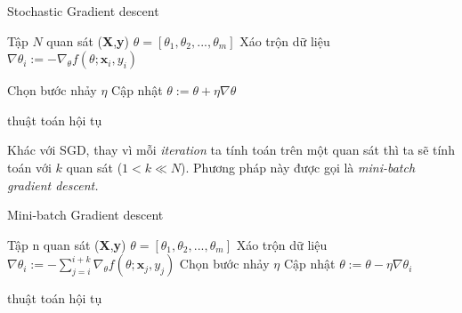 \begin{algorithm}[H]
\label{alg:sgd}
\caption{Stochastic Gradient descent}
\begin{algorithmic}[1]
\REQUIRE Tập $N$ quan sát (\textbf{X},\textbf{y})
\REQUIRE  $\theta=[\theta_1,\theta_2,...,\theta_m]$
\REPEAT 
\STATE Xáo trộn dữ liệu
\STATE $\nabla \theta_i := - \nabla_{\theta}f(\theta;\textbf{x}_i,y_i)$

\STATE Chọn bước nhảy $\eta$
\STATE Cập nhật $\theta := \theta + \eta\nabla\theta$
	\STATE {}
\ENDIF
\ENDFOR

\UNTIL	thuật toán hội tụ
\end{algorithmic}
\end{algorithm}
Khác với SGD, thay vì mỗi \textit{iteration} ta tính toán trên một quan sát thì ta sẽ tính toán với $k$ quan sát ($1<k\ll N$). Phương pháp này được gọi là \textit{mini-batch gradient descent.}

\begin{algorithm}[H]
\label{alg:minibatch}
\caption{Mini-batch Gradient descent}
\begin{algorithmic}[1]
\REQUIRE Tập n quan sát (\textbf{X},\textbf{y})
\REQUIRE $\theta=[\theta_1,\theta_2,...,\theta_m]$
\REPEAT 
\STATE Xáo trộn dữ liệu
\STATE $\nabla \theta_i := -\sum^{i+k}_{j=i} \nabla_{\theta}f(\theta;\textbf{x}_j,y_j)$
\STATE Chọn bước nhảy $\eta$
\STATE Cập nhật $\theta := \theta - \eta\nabla\theta_i$
	\STATE {}
\ENDIF

\ENDFOR

\UNTIL	thuật toán hội tụ
\end{algorithmic} 

\end{algorithm}

